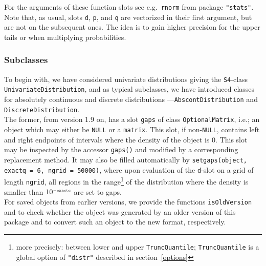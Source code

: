 \documentclass[11pt]{article}
\newcommand{\code}[1]{{\tt #1}}
\newcommand{\pkg}[1]{{\tt "#1"}}
\begin{document}
For the arguments of these function slots see e.g.\ \code{rnorm}
from package \pkg{stats}.
Note that, as usual, slots \code{d}, \code{p}, and \code{q} are vectorized
in their first argument, but are not on the subsequent ones.
The idea is to gain higher precision for the upper tails or when multiplying
probabilities.
\subsubsection{Subclasses}
To begin with, we have considered univariate distributions giving the 
{\tt S4}-class \code{UnivariateDistribution}, and as typical subclasses, we 
have introduced classes for absolutely continuous and discrete distributions 
---\code{AbscontDistribution} and \code{DiscreteDistribution}.\\

The former, from version 1.9 on, has a slot \code{gaps} of class 
\code{OptionalMatrix}, i.e.; an object which may either be \code{NULL} or
a \code{matrix}. This slot, if non-\code{NULL}, contains left and right 
endpoints of intervals where the density of the object is $0$. This slot 
may be inspected by the accessor \code{gaps()} and modified by a corresponding
replacement method. It may also be filled automatically by 
\code{setgaps(object, exactq = 6, ngrid = 50000)}, where upon evaluation of 
the \code{d}-slot on a grid of length \code{ngrid}, all regions in the 
range\footnote{more precisely: between lower and upper \code{TruncQuantile};
 \code{TruncQuantile} is a global option of  \pkg{distr} described in 
 section~\ref{options}} of the distribution where the density is smaller than 
 $10^{\scriptscriptstyle - {\rm exactq}}$ are set to gaps.\\ For saved objects 
 from earlier versions, we provide the functions \code{isOldVersion} and 
 \linebreak[4]\code{conv2NewVersion} to check whether the
object was generated by an older version of this package and
to convert such an object to the new format, respectively.\\
\end{document}
